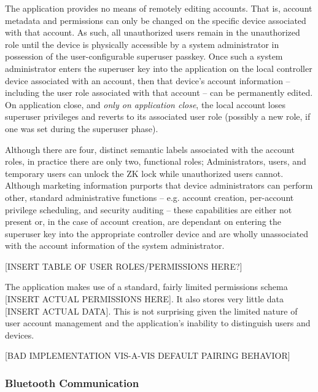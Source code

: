 \documentclass[journal]{IEEEtran}
\begin{document}
\bigskip

The application provides no means of remotely editing accounts.  That is, account metadata and permissions can only be changed on the specific device associated with that account. As such, all unauthorized users remain in the unauthorized role until the device is physically accessible by a system administrator in possession of the user-configurable superuser passkey.  Once such a system administrator enters the superuser key into the application on the local controller device associated with an account, then that device's account information -- including the user role associated with that account -- can be permanently edited.  On application close, and \textit{only on application close}, the local account loses superuser privileges and reverts to its associated user role (possibly a new role, if one was set during the superuser phase).

\bigskip

Although there are four, distinct semantic labels associated with the account roles, in practice there are only two, functional roles;  Administrators, users, and temporary users can unlock the ZK lock while unauthorized users cannot.  Although marketing information purports that device administrators can perform other, standard administrative functions -- e.g. account creation, per-account privilege scheduling, and security auditing -- these capabilities are either not present or, in the case of account creation, are dependant on entering the superuser key into the appropriate controller device and are wholly unassociated with the account information of the system administrator.

\bigskip

[INSERT TABLE OF USER ROLES/PERMISSIONS HERE?]

\bigskip

The application makes use of a standard, fairly limited permissions schema [INSERT ACTUAL PERMISSIONS HERE].  It also stores very little data [INSERT ACTUAL DATA].  This is not surprising given the limited nature of user account management and the application's inability to distinguish users and devices.  

\bigskip

[BAD IMPLEMENTATION VIS-A-VIS DEFAULT PAIRING BEHAVIOR]

\bigskip
\subsubsection{Bluetooth Communication}
\end{document}
